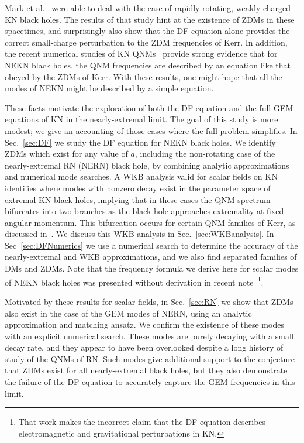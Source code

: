 \begin{refsection}
Mark et al.~\cite{Mark:2014aja} were able to deal with the case of rapidly-rotating, weakly charged KN black holes. The results of that study hint at the existence of ZDMs in these spacetimes, and surprisingly also show that the DF equation alone provides the correct small-charge perturbation to the ZDM frequencies of Kerr.
In addition, the recent numerical studies of KN QNMs~\cite{Zilhao:2014wqa, Dias:2015wqa} provide strong evidence that for NEKN black holes, the QNM frequencies are described by an equation like that obeyed by the ZDMs of Kerr. 
With these results, one might hope that all the modes of NEKN might be described by a simple equation.


These facts motivate the exploration of both the DF equation and the full GEM equations of KN in the nearly-extremal limit.
The goal of this study is more modest; we give an accounting of those cases where the full problem simplifies.
In Sec.~\ref{sec:DF} we study the DF equation for NEKN black holes. We identify ZDMs which exist for any value of $a$, including the non-rotating case of the nearly-extremal RN (NERN) black hole, by combining analytic approximations and numerical mode searches.
A WKB analysis valid for scalar fields on KN~\cite{HodEikonal2012,Zhao:2015pqa} identifies where modes with nonzero decay exist in the parameter space of extremal KN black holes, implying that in these cases the QNM spectrum bifurcates into two branches as the black hole approaches extremality at fixed angular momentum. 
This bifurcation occurs for certain QNM families of Kerr, as discussed in~\cite{Yang:2012pj,Yang:2013uba}.
We discuss this WKB analysis in Sec.~\ref{sec:WKBanalysis}.
In Sec~\ref{sec:DFNumerics} we use a numerical search to determine the accuracy of the nearly-extremal and WKB approximations, and we also find separated families of DMs and ZDMs.
Note that the frequency formula we derive here for scalar modes of NEKN black holes was presented without derivation in recent note~\cite{Hod:2014uqa}\footnote{That work makes the incorrect claim that the DF equation describes electromagnetic and gravitational perturbations in KN.}.

Motivated by these results for scalar fields, in Sec.~\ref{sec:RN} we show that ZDMs also exist in the case of the GEM modes of NERN, using an analytic approximation and matching ansatz. We confirm the existence of these modes with an explicit numerical search.
These modes are purely decaying with a small decay rate, and they appear to have been overlooked despite a long history of study of the QNMs of RN. 
Such modes give additional support to the conjecture that ZDMs exist for all nearly-extremal black holes, but they also demonstrate the failure of the DF equation to accurately capture the GEM frequencies in this limit.


\end{refsection}
